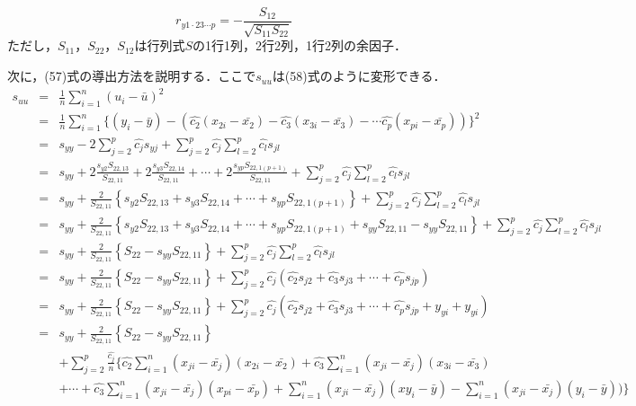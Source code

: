 \documentclass[dvipdfmx]{jsarticle}
\begin{document}
\begin{equation}
  r_{y1\cdot23\cdots p}=-\frac{S_{12}}{\sqrt{S_{11}S_{22}}}
\end{equation}
ただし，$S_{11}$，$S_{22}$，$S_{12}$は行列式$S$の1行1列，2行2列，1行2列の余因子．
\par
次に，(57)式の導出方法を説明する．ここで$s_{uu}$は(58)式のように変形できる．
\begin{eqnarray}
  s_{uu}&=&\frac{1}{n}\sum_{i=1}^n(u_i-\bar{u})^2 \nonumber \\
  &=&\frac{1}{n}\sum_{i=1}^n \{(y_i-\bar{y})-(\hat{c_2}(x_{2i}-\bar{x_2})-\hat{c_3}(x_{3i}-\bar{x_3})-\cdots\hat{c_p}(x_{pi}-\bar{x_p}))\}^2  \nonumber \\
  &=&s_{yy}-2\sum_{j=2}^p \hat{c_j}s_{yj} + \sum_{j=2}^p\hat{c_j}\sum_{l=2}^p\hat{c_l}s_{jl} \nonumber \\
  &=&s_{yy}+2\frac{s_{y2}S_{22,13}}{S_{22,11}}+2\frac{s_{y3}S_{22,14}}{S_{22,11}}+\cdots+2\frac{s_{yp}S_{22,1(p+1)}}{S_{22,11}} + \sum_{j=2}^p\hat{c_j}\sum_{l=2}^p\hat{c_l}s_{jl}  \nonumber \\
  &=&s_{yy}+\frac{2}{S_{22,11}}\left\{s_{y2}S_{22,13}+s_{y3}S_{22,14}+\cdots+s_{yp}S_{22,1(p+1)}\right\}  + \sum_{j=2}^p\hat{c_j}\sum_{l=2}^p\hat{c_l}s_{jl} \nonumber \\
  &=&  s_{yy}+\frac{2}{S_{22,11}}\left\{s_{y2}S_{22,13}+s_{y3}S_{22,14}+\cdots+s_{yp}S_{22,1(p+1)}+s_{yy}S_{22,11}-s_{yy}S_{22,11}\right\}  + \sum_{j=2}^p\hat{c_j}\sum_{l=2}^p\hat{c_l}s_{jl}\nonumber \\
  &=& s_{yy}+\frac{2}{S_{22,11}}\left\{S_{22}-s_{yy}S_{22,11}\right\}  + \sum_{j=2}^p\hat{c_j}\sum_{l=2}^p\hat{c_l}s_{jl}\nonumber \\
  &=& s_{yy}+\frac{2}{S_{22,11}}\left\{S_{22}-s_{yy}S_{22,11}\right\}  + \sum_{j=2}^p\hat{c_j}(\hat{c_2}s_{j2}+\hat{c_3}s_{j3}+\cdots+\hat{c_p}s_{jp})\nonumber \\
  &=& s_{yy}+\frac{2}{S_{22,11}}\left\{S_{22}-s_{yy}S_{22,11}\right\}  + \sum_{j=2}^p\hat{c_j}(\hat{c_2}s_{j2}+\hat{c_3}s_{j3}+\cdots+\hat{c_p}s_{jp}+y_{yi}+y_{yi})\nonumber \\
  &=& s_{yy}+\frac{2}{S_{22,11}}\left\{S_{22}-s_{yy}S_{22,11}\right\} \nonumber \\
  && + \sum_{j=2}^p\frac{\hat{c_j}}{n}\{\hat{c_2}\sum_{i=1}^n(x_{ji}-\bar{x_j})(x_{2i}-\bar{x_2})+\hat{c_3}\sum_{i=1}^n (x_{ji}-\bar{x_j})(x_{3i}-\bar{x_3}) \nonumber \\
  && +\cdots+\hat{c_3}\sum_{i=1}^n(x_{ji}-\bar{x_j})(x_{pi}-\bar{x_p})+\sum_{i=1}^n(x_{ji}-\bar{x_j})(xy_{i}-\bar{y})-\sum_{i=1}^n(x_{ji}-\bar{x_j})(y_{i}-\bar{y}))\} \nonumber \\

\end{eqnarray}
\end{document}
